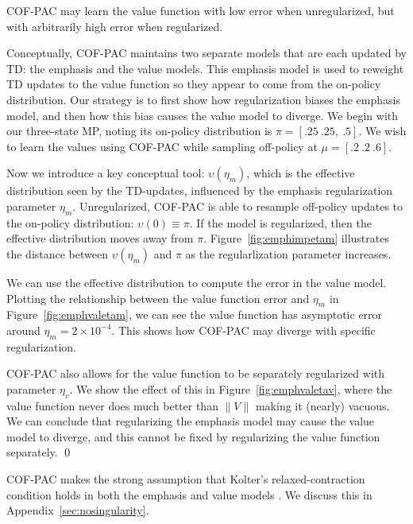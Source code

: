 \begin{example}\label{ex:emph}
  COF-PAC may learn the value function with low error when unregularized, but with arbitrarily high error when regularized.

  \vspace{-1.25em}
  \proof Conceptually, COF-PAC maintains two separate models that are each updated by TD: the emphasis and the value models. This emphasis model is used to reweight TD updates to the value function so they appear to come from the on-policy distribution. Our strategy is to first show how regularization biases the emphasis model, and then how this bias causes the value model to diverge.
  We begin with our three-state MP, noting its on-policy distribution is $\pi=[.25~.25,~.5]$. We wish to learn the values using COF-PAC while sampling off-policy at $\mu=[.2~.2~.6]$.

  Now we introduce a key conceptual tool: $\upsilon(\eta_m)$, which is the effective distribution seen by the TD-updates, influenced by the emphasis regularization parameter $\eta_m$. Unregularized, COF-PAC is able to resample off-policy updates to the on-policy distribution:  $\upsilon(0) \equiv \pi$. If the model is regularized, then the effective distribution moves away from $\pi$. Figure~\ref{fig:emphimpetam} illustrates the distance between $\upsilon(\eta_m)$ and $\pi$ as the regularlization parameter increases.

  We can use the effective distribution to compute the error in the value model. Plotting the relationship between the value function error and $\eta_m$ in Figure~\ref{fig:emphvaletam}, we can see the value function has asymptotic error around $\eta_m=2\times 10^{-4}$. This shows how COF-PAC may diverge with specific regularization.

  COF-PAC also allows for the value function to be separately regularized with parameter $\eta_v$. We show the effect of this in Figure~\ref{fig:emphvaletav}, where the value function never does much better than $\|V\|$ making it (nearly) vacuous. We can conclude that regularizing the emphasis model may cause the value model to diverge, and this cannot be fixed by regularizing the value function separately. \qed
\end{example}

COF-PAC makes the strong assumption that Kolter's relaxed-contraction condition \cite[eqn.~10]{kolter2011fixed} holds in both the emphasis and value models \cite[asm.~4]{zhang2020provably}. We discuss this in Appendix~\ref{sec:nosingularity}.


